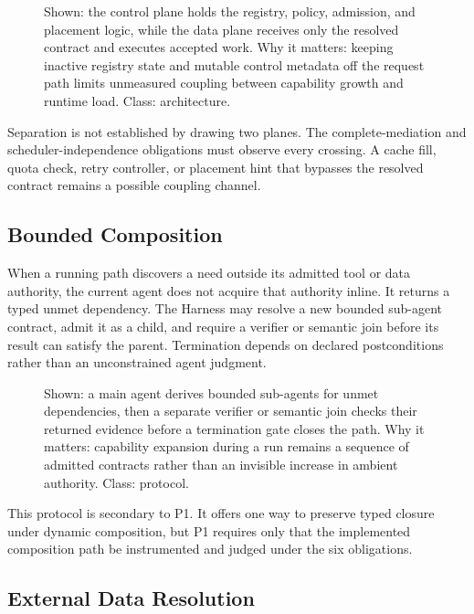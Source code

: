 \begin{figure}[t]
\centering
\caption{Shown: the control plane holds the registry, policy, admission, and placement logic, while the data plane receives only the resolved contract and executes accepted work. Why it matters: keeping inactive registry state and mutable control metadata off the request path limits unmeasured coupling between capability growth and runtime load. Class: architecture.}
\label{fig:control-data}
\end{figure}

Separation is not established by drawing two planes. The complete-mediation and scheduler-independence obligations must observe every crossing. A cache fill, quota check, retry controller, or placement hint that bypasses the resolved contract remains a possible coupling channel.

\subsection{Bounded Composition}

When a running path discovers a need outside its admitted tool or data authority, the current agent does not acquire that authority inline. It returns a typed unmet dependency. The Harness may resolve a new bounded sub-agent contract, admit it as a child, and require a verifier or semantic join before its result can satisfy the parent. Termination depends on declared postconditions rather than an unconstrained agent judgment.

\begin{figure}[t]
\centering
\caption{Shown: a main agent derives bounded sub-agents for unmet dependencies, then a separate verifier or semantic join checks their returned evidence before a termination gate closes the path. Why it matters: capability expansion during a run remains a sequence of admitted contracts rather than an invisible increase in ambient authority. Class: protocol.}
\label{fig:derivation-closure}
\end{figure}

This protocol is secondary to P1. It offers one way to preserve typed closure under dynamic composition, but P1 requires only that the implemented composition path be instrumented and judged under the six obligations.

\subsection{External Data Resolution}

